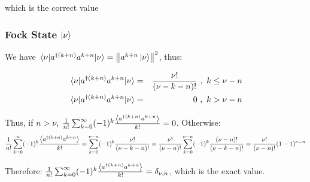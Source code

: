 which is the correct value

\subsubsection{Fock State $\ket{\nu}$}

We have $\mel{\nu}{a^{\dagger (k+n)} a^{k+n}}{\nu} = \left\Vert a^{k+n} \ket{\nu} \right\Vert^2$, thus:

\begin{eqnarray}
    \mel{\nu}{a^{\dagger (k+n)} a^{k+n}}{\nu} &=& \frac{\nu!}{(\nu-k-n)!} \ , \ k \le \nu - n\\
    \mel{\nu}{a^{\dagger (k+n)} a^{k+n}}{\nu} &=& 0 \ , \ k > \nu - n
\end{eqnarray}

Thus, if $n > \nu$, $\frac{1}{n!} \sum_{k=0}^\infty (-1)^k \frac{\left\langle a^{\dagger (k+n)} a^{k+n} \right\rangle}{k!} = 0$. Otherwise:
\begin{equation}
    \frac{1}{n!} \sum_{k=0}^\infty (-1)^k \frac{\left\langle a^{\dagger (k+n)} a^{k+n} \right\rangle}{k!} = \sum_{k=0}^{\nu - n} (-1)^k \frac{\nu!}{(\nu-k-n)!} = \frac{\nu!}{(\nu-n)!} \sum_{k=0}^{\nu - n} (-1)^k \frac{(\nu-n)!}{(\nu-k-n)!} = \frac{\nu!}{(\nu-n)!} (1-1)^{\nu - n}
\end{equation}

Therefore: $\frac{1}{n!} \sum_{k=0}^\infty (-1)^k \frac{\left\langle a^{\dagger (k+n)} a^{k+n} \right\rangle}{k!} = \delta_{\nu, n}$, which is the exact value.
